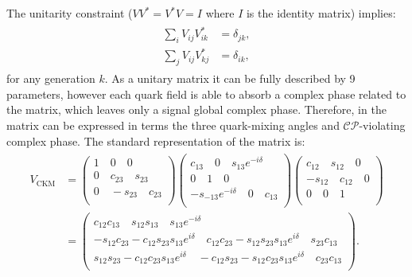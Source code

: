 The unitarity constraint ($VV^{*}=V^{*}V=I$ where $I$ is the identity matrix) implies:
\begin{align}\label{eq:unitarity}
    \begin{split}
    \sum_i V_{ij} V_{ik}^* &= \delta_{jk},\\
    \sum_j V_{ij} V_{kj}^* &= \delta_{ik},
    \end{split}
\end{align}
for any generation $k$.
As a unitary matrix it can be fully described by 9 parameters, however each quark field is able to absorb a complex phase related to the matrix,
which leaves only a signal global complex phase.
Therefore, in \SM the \CKM matrix can be expressed in terms the three quark-mixing angles and $\mathcal{CP}$-violating complex phase.
The standard representation of the \CKM matrix is:
\begin{align}
    \begin{split}
    V_{\mathrm{CKM}}&=
    \begin{pmatrix}
        1 \quad 0 \quad 0\\
        0 \quad c_{23} \quad s_{23}\\
        0 \quad -s_{23} \quad c_{23}\\
    \end{pmatrix}
    \begin{pmatrix}
        c_{13} \quad 0 \quad s_{13}e^{-i\delta}\\
        0      \quad 1 \quad 0\\
        -s_{-13}e^{-i\delta} \quad 0 \quad c_{13}\\
    \end{pmatrix}
    \begin{pmatrix}
        c_{12} \quad s_{12} \quad 0\\
        -s_{12} \quad c_{12} \quad 0\\
        0 \quad 0 \quad 1\\
    \end{pmatrix}
    \\
    &=
    \begin{pmatrix}
        c_{12}c_{13} \quad s_{12}s_{13} \quad s_{13}e^{-i\delta}\\
        -s_{12}c_{23} - c_{12}s_{23}s_{13}e^{i\delta} \quad c_{12}c_{23} - s_{12}s_{23}s_{13}e^{i\delta} \quad s_{23} c_{13}\\
        s_{12}s_{23} - c_{12}c_{23} s_{13}e^{i\delta} \quad -c_{12}s_{23} - s_{12}c_{23}s_{13}e^{i\delta} \quad c_{23}c_{13}\\
    \end{pmatrix}.
    \end{split}
\end{align}
